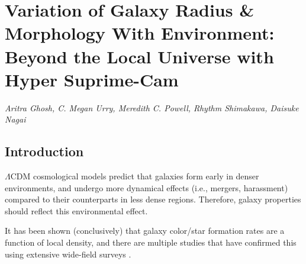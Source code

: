 \chapter{Variation of Galaxy Radius \& Morphology With Environment: Beyond the Local Universe with Hyper Suprime-Cam} \label{chap:morph_den}


{\large \emph{Aritra Ghosh, C. Megan Urry, Meredith C. Powell, Rhythm Shimakawa, Daisuke Nagai}} 


\section{Introduction} \label{sec_c4:intro}

$\Lambda$CDM cosmological models predict that galaxies form early in denser environments, and undergo more dynamical effects (i.e., mergers, harassment) compared to their counterparts in less dense regions. Therefore, galaxy properties should reflect this environmental effect.

It has been shown (conclusively) that galaxy color/star formation rates are a function of local density, and there are multiple studies that have confirmed this using extensive wide-field surveys \citep[e.g.,][]{Kauffmann04, Blanton05, Tanaka05, Peng10, Wetzel12, Alpaslan15, Duarte18, Old20}.


